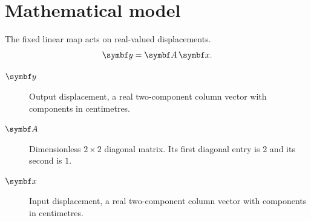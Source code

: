 \section{Mathematical model}
The fixed linear map acts on real-valued displacements.
\begin{equation}
  \nerudavector{y} = \nerudamatrix{A}\,\nerudavector{x}.
  \label{eq:scaling}
\end{equation}
\begin{description}
  \item[$\nerudavector{y}$] Output displacement, a real two-component column
    vector with components in centimetres.
  \item[$\nerudamatrix{A}$] Dimensionless \(2\times2\) diagonal matrix.
    Its first diagonal entry is \(2\) and its second is \(1\).
  \item[$\nerudavector{x}$] Input displacement, a real two-component column
    vector with components in centimetres.
\end{description}

